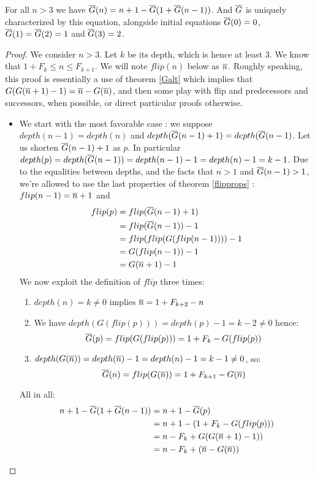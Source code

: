 \documentclass[a4paper,11pt]{article}
\begin{document}
\begin{theorem}\label{FGeqn}
For all $n>3$ we have $\overline{G}(n) = n+1 - \overline{G}(1+\overline{G}(n-1))$.
And $\overline{G}$ is uniquely characterized by this equation,
alongside initial equations $\overline{G}(0)=0$, $\overline{G}(1)=\overline{G}(2)=1$ and
$\overline{G}(3)=2$.
\end{theorem}
\begin{proof}
We consider $n>3$. Let $k$ be its depth, which is hence at
least 3. We know that $1+F_k \le n \le F_{k+1}$. We will note
$flip(n)$ below as $\overline{n}$. Roughly speaking, this proof is
essentially a use of theorem \ref{Galt} which implies that
$G(G(\overline{n}+1)-1) = \overline{n} - G(\overline{n})$, and then some
play with flip and predecessors and successors, when possible,
or direct particular proofs otherwise.
\begin{itemize}
\item We start with the most favorable case : we suppose
$depth(n-1)=depth(n)$ and $depth(\overline{G}(n-1)+1)=depth(\overline{G}(n-1)$.
Let us shorten $\overline{G}(n-1)+1$ as $p$. In particular
$depth(p)=depth(\overline{G}(n-1))=depth(n-1)-1=depth(n)-1=k-1$.
Due to the equalities between depths, and the facts that
$n>1$ and $\overline{G}(n-1)>1$, we're allowed to use the
last properties of theorem \ref{flipprops} : $flip(n-1)=\overline{n}+1$ and
\begin{align*}
flip(p) &= flip(\overline{G}(n-1)+1) \\
        &= flip(\overline{G}(n-1))-1 \\
        &= flip(flip(G(flip(n-1))))-1 \\
        &= G(flip(n-1))-1 \\
        &= G(\overline{n}+1)-1
\end{align*}
We now exploit the definition of $flip$ three times:
\begin{enumerate}
\item $depth(n)=k\neq 0$ implies $\overline{n}=1+F_{k+2}-n$
\item
We have
$depth(G(flip(p)))=depth(p)-1=k-2 \neq 0$ hence:
$$\overline{G}(p) = flip(G(flip(p))) = 1+F_k-G(flip(p))$$
\item $depth(G(\overline{n}))=depth(\overline{n})-1=depth(n)-1=k-1 \neq 0$, so:
$$\overline{G}(n)=flip(G(\overline{n}))=1+F_{k+1}-G(\overline{n})$$
\end{enumerate}
All in all:
\begin{align*}
n+1-\FG(1+\FG(n-1)) & = n+1-\FG(p) \\
                    & = n+1-(1+F_k-G(flip(p))) \\
                    & = n-F_k+G(G(\nn+1)-1)) \\
                    & = n-F_k+(\nn-G(\nn)) \\

\end{align*}
\end{itemize}
\end{proof}
\end{document}
